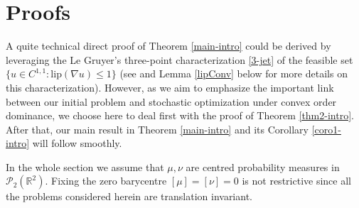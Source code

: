 \documentclass[11pt,letterpaper,reqno]{amsart}
\theoremstyle{definition}
\numberwithin{equation}{section}
\newcommand{\R}{\mathbb{R}}
\newcommand{\PP}{\mathcal{P}}
\newcommand{\Lip}{{\mathrm{lip}}}
\begin{document}
\bigskip
\section{Proofs} \label{proofs}
A quite technical direct proof of Theorem \ref{main-intro} could be derived  by leveraging the Le Gruyer's three-point characterization \eqref{3-jet}  of the  feasible set $\{u\in C^{1,1} : \Lip(\nabla u)\le 1\}$ (see   \cite{legruyer2009}  {and Lemma \ref{lipConv} below} for more details on this characterization).
However, as we aim to emphasize the important link between our initial problem and stochastic optimization under convex order dominance,  we choose here to deal first with the proof of Theorem \ref{thm2-intro}. After that, our main result in Theorem \ref{main-intro} and its Corollary \ref{coro1-intro} will follow smoothly. 

 In the whole section we assume that $\mu,\nu$ are centred probability measures in $\PP_2(\R^2)$. Fixing the zero barycentre $[\mu] = [\nu] = 0$ is not restrictive since  all the problems considered herein are translation invariant.
 

 
\end{document}

